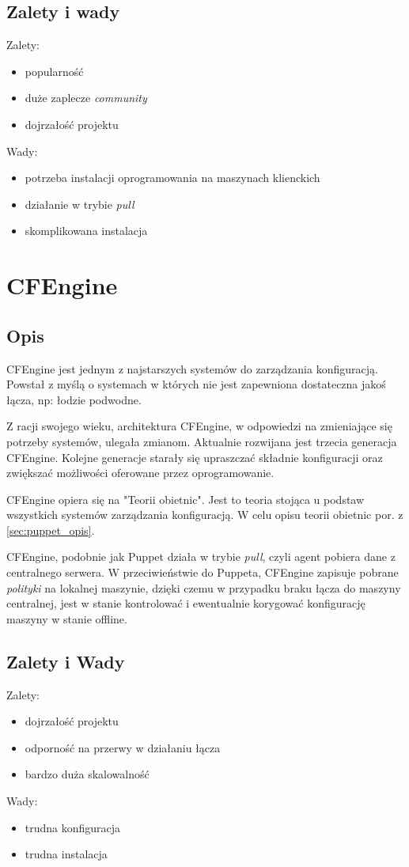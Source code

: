 \subsection{Zalety i wady}
Zalety:
\begin{itemize}
	\item popularność
	\item duże zaplecze \textit{community}
	\item dojrzałość projektu
\end{itemize}
Wady:
\begin{itemize}
	\item potrzeba instalacji oprogramowania na maszynach klienckich
	\item działanie w trybie \textit{pull}
	\item skomplikowana instalacja
\end{itemize}

\section{CFEngine}
\subsection{Opis}
CFEngine jest jednym z najstarszych systemów do zarządzania konfiguracją.
Powstał z myślą o systemach w których nie jest zapewniona dostateczna jakoś łącza, np: łodzie podwodne.

Z racji swojego wieku, architektura CFEngine, w odpowiedzi na zmieniające się potrzeby systemów, ulegała zmianom.
Aktualnie rozwijana jest trzecia generacja CFEngine.
Kolejne generacje starały się upraszczać składnie konfiguracji oraz zwiększać możliwości oferowane przez oprogramowanie.

CFEngine opiera się na "Teorii obietnic".
Jest to teoria stojąca u podstaw wszystkich systemów zarządzania konfiguracją. W celu opisu teorii obietnic por. z \ref{sec:puppet_opis}.

CFEngine, podobnie jak Puppet działa w trybie \textit{pull}, czyli agent pobiera dane z centralnego serwera.
W przeciwieństwie do Puppeta, CFEngine zapisuje pobrane \textit{polityki} na lokalnej maszynie, dzięki czemu w przypadku braku łącza do maszyny centralnej, jest w stanie kontrolować i ewentualnie korygować konfigurację maszyny w stanie offline.
\subsection{Zalety i Wady}
Zalety:
\begin{itemize}
	\item dojrzałość projektu
	\item odporność na przerwy w działaniu łącza
	\item bardzo duża skalowalność
\end{itemize}
Wady:
\begin{itemize}
	\item trudna konfiguracja
	\item trudna instalacja
\end{itemize}
